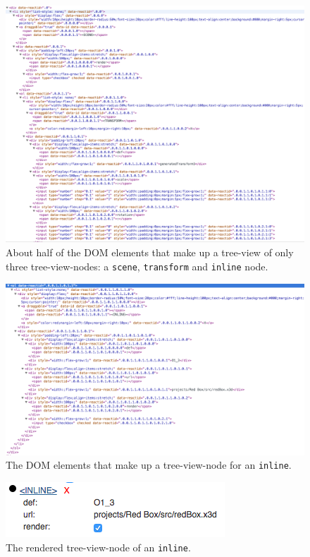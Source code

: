 \begin{figure}
  \centering
  \includegraphics[width=\textwidth]{../assets/treeview-dom.png}
  \caption{About half of the \gls{DOM} elements that make up a tree-view of only three tree-view-nodes: a \texttt{scene}, \texttt{transform} and \texttt{inline} node.}
  \label{fig:treeview-dom}
\end{figure}

\begin{figure}
  \centering
  \includegraphics[width=\textwidth]{../assets/treeview-node-dom.png}
  \caption{The \gls{DOM} elements that make up a tree-view-node for an \texttt{inline}.}
  \label{fig:tree-view-node-dom}
\end{figure}

\begin{figure}
  \centering
  \includegraphics[width=.5\textwidth]{../assets/tree-view-node-rendered.png}
  \caption{The rendered tree-view-node of an \texttt{inline}.}
  \label{fig:tree-view-node-rendered}
\end{figure}

